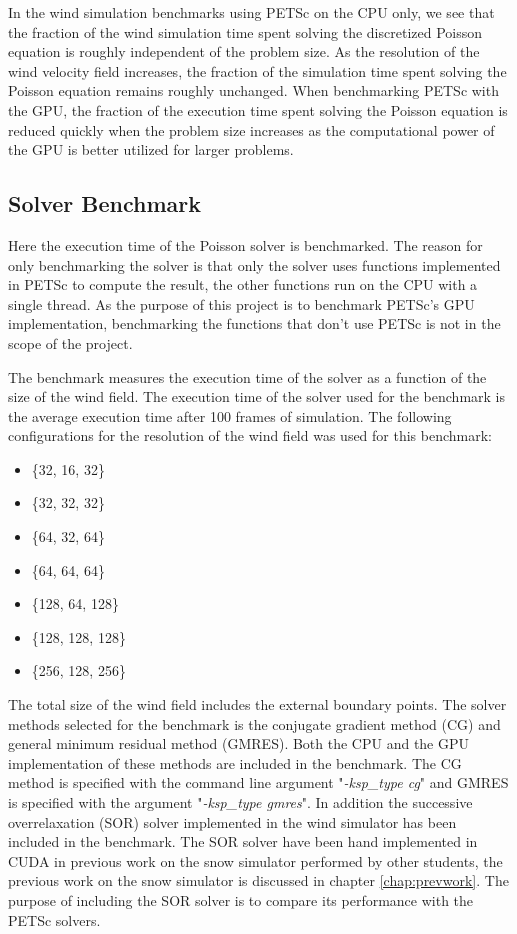 In the wind simulation benchmarks using PETSc on the CPU only, we see that the
fraction of the wind simulation time spent solving the discretized Poisson
equation is roughly independent of the problem size. As the resolution of the
wind velocity field increases, the fraction of the simulation time spent solving
the Poisson equation remains roughly unchanged. When benchmarking PETSc with the
GPU, the fraction of the execution time spent solving the Poisson equation is
reduced quickly when the problem size increases as the computational power of the
GPU is better utilized for larger problems.

\subsection{Solver Benchmark}

Here the execution time of the Poisson solver is benchmarked. The reason for
only benchmarking the solver is that only the solver uses functions implemented
in PETSc to compute the result, the other functions run on the CPU with a single
thread. As the purpose of this project is to benchmark PETSc's GPU
implementation, benchmarking the functions that don't use PETSc is not in the
scope of the project.

The benchmark measures the execution time of the solver as a function of the
size of the wind field. The execution time of the solver used for the benchmark
is the average execution time after 100 frames of simulation. The following
configurations for the resolution of the wind field was used for this benchmark:

\begin{itemize}
	\item \{32, 16, 32\}
	\item \{32, 32, 32\}
	\item \{64, 32, 64\}
	\item \{64, 64, 64\}
	\item \{128, 64, 128\}
	\item \{128, 128, 128\}
	\item \{256, 128, 256\}
\end{itemize}

The total size of the wind field includes the external boundary points. The
solver methods selected for the benchmark is the conjugate gradient method (CG)
and general minimum residual method (GMRES). Both the CPU and the GPU
implementation of these methods are included in the benchmark. The CG method is
specified with the command line argument "\emph{-ksp\_type cg}" and GMRES is
specified with the argument "\emph{-ksp\_type gmres}". In addition the
successive overrelaxation (SOR) solver implemented in the wind simulator has
been included in the benchmark. The SOR solver have been hand implemented in
CUDA in previous work on the snow simulator performed by other students, the
previous work on the snow simulator is discussed in chapter \ref{chap:prevwork}.
The purpose of including the SOR solver is to compare its performance with the
PETSc solvers.

